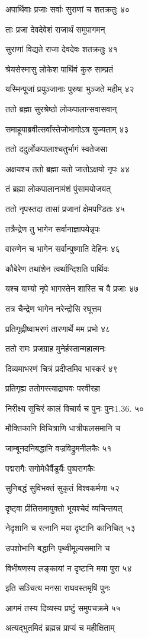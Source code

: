 अपार्थिवाः प्रजाः सर्वाः सुराणां च शतक्रतुः ४०

ताः प्रजा देवदेवेशं राजार्थं समुपागमन्

सुराणां विद्यते राजा देवदेवः शतक्रतुः ४१

श्रेयसेस्मासु लोकेश पार्थिवं कुरु साम्प्रतं

यस्मिन्पूजां प्रयुञ्जानाः पुरुषा भुञ्जते महीम् ४२

ततो ब्रह्मा सुरश्रेष्ठो लोकपालान्सवासवान्

समाहूयाब्रवीत्सर्वांस्तेजोभागोऽत्र युज्यताम् ४३

ततो ददुर्लोकपालाश्चतुर्भागं स्वतेजसा

अक्षयश्च ततो ब्रह्मा यतो जातोऽक्षयो नृपः ४४

तं ब्रह्मा लोकपालानामंशं पुंसामयोजयत्

ततो नृपस्तदा तासां प्रजानां क्षेमपण्डितः ४५

तत्रैन्द्रेण तु भागेन सर्वानाज्ञापयेन्नृपः

वारुणेन च भागेन सर्वान्पुष्णाति देहिनः ४६

कौबेरेण तथांशेन त्वर्थान्दिशति पार्थिवः

यश्च याम्यो नृपे भागस्तेन शास्ति च वै प्रजाः ४७

तत्र चैन्द्रेण भागेन नरेन्द्रोसि रघूत्तम

प्रतिगृह्णीष्वाभरणं तारणार्थे मम प्रभो ४८

ततो रामः प्रजग्राह मुनेर्हस्तान्महात्मनः

दिव्यमाभरणं चित्रं प्रदीप्तमिव भास्करं ४९

प्रतिगृह्य ततोगस्त्याद्राघवः परवीरहा

निरीक्ष्य सुचिरं कालं विचार्य च पुनः पुनः1.36. ५०

मौक्तिकानि विचित्राणि धात्रीफलसमानि च

जाम्बूनदनिबद्धानि वज्रविद्रुमनीलकैः ५१

पद्मरागैः सगोमेधैर्वैडूर्यैः पुष्परागकैः

सुनिबद्धं सुविभक्तं सुकृतं विश्वकर्मणा ५२

दृष्ट्वा प्रीतिसमायुक्तो भूयश्चेदं व्यचिन्तयत्

नेदृशानि च रत्नानि मया दृष्टानि कानिचित् ५३

उपशोभानि बद्धानि पृथ्वीमूल्यसमानि च

विभीषणस्य लङ्कायां न दृष्टानि मया पुरा ५४

इति सञ्चित्य मनसा राघवस्तमृषिं पुनः

आगमं तस्य दिव्यस्य प्रष्टुं समुपचक्रमे ५५

अत्यद्भुतमिदं ब्रह्मन्न प्राप्यं च महीक्षिताम्

